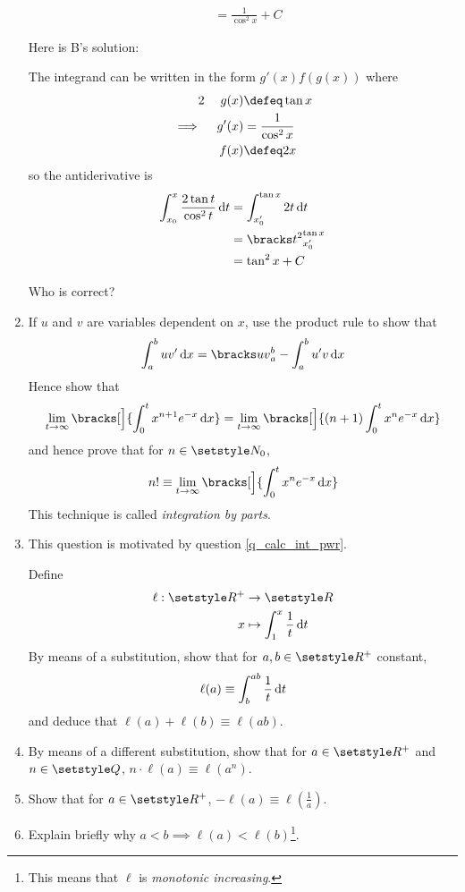 \begin{enumerate}
\begin{tcolorbox}
\begin{align*}
     &= \frac 1{\cos^2 x} + C
   \end{align*}
  \end{tcolorbox}
  Here is B's solution:
  \begin{tcolorbox}
   The integrand can be written in the form \(g'(x) f(g(x))\) where
   \begin{alignat*}2
    &&g(x) &\defeq \tan x \\
    \implies{}&& g'(x) &= \frac 1{\cos^2 x} \\
    &&f(x) &\defeq 2x
   \end{alignat*}
   so the antiderivative is
   \begin{align*}
    \integ[x_0]<x>{\frac{2\tan t}{\cos^2 t}}{t}
     &= \integ[x_0']<\tan x>{2t}{t} \\
     &= \eval{x_0'}{\tan x}{t^2} \\
     &= \tan^2 x + C
   \end{align*}
  \end{tcolorbox}
  Who is correct?
 \item
  If \(u\) and \(v\) are variables dependent on \(x\), use the product rule to
  show that
  \begin{equation*}
   \integ[a]<b>{uv'}{x} = \eval{a}{b}{uv} - \integ[a]<b>{u'v}{x}
  \end{equation*}
  Hence show that
  \begin{equation*}
   \lim_{t \to \infty}
    \bracks[\Big]{
     \integ[0]<t>{x^{n + 1} e^{-x}}{x}
    } =
   \lim_{t \to \infty}
    \bracks[\Big]{
     (n + 1)\integ[0]<t>{x^n e^{-x}}{x}
    }
  \end{equation*}
  and hence prove that for \(n \in \Naturals_0\),
  \begin{equation*}
   n! \equiv \lim_{t \to \infty}
    \bracks[\Big]{
     \integ[0]<t>{x^n e^{-x}}{x}
    }
  \end{equation*}
  This technique is called \emph{integration by parts}.
 \item
  This question is motivated by question \ref{q_calc_int_pwr}.

  Define
  \begin{align*}
   \ell : \Reals^+ &\to \Reals\\
   x &\mapsto \integ[1]<x>{\frac 1t}{t}
  \end{align*}
  By means of a substitution, show that for \(a, b \in \Reals^+\) constant,
  \begin{equation*}
   \ell(a) \equiv \integ[b]<ab>{\frac 1t}{t}
  \end{equation*}
  and deduce that \(\ell(a) + \ell(b) \equiv \ell(ab)\).
 \item
  By means of a different substitution, show that for \(a \in \Reals^+\) and
  \(n \in \Rationals\), \(n \cdot \ell(a) \equiv \ell(a^n)\).
 \item
  Show that for \(a \in \Reals^+\), \(-\ell(a) \equiv \ell(\frac 1a)\).
 \item
  Explain briefly why \(a < b \implies \ell(a) < \ell(b)\)\footnote{
   This means that \(\ell\) is \emph{monotonic increasing}.
  }.


\end{enumerate}
